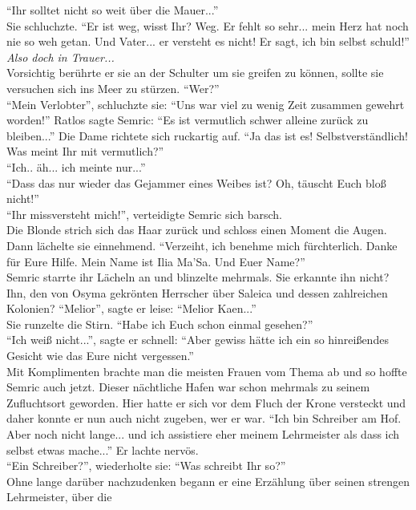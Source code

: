 ``Ihr solltet nicht so weit über die Mauer...''\\
Sie schluchzte. ``Er ist weg, wisst Ihr? Weg. Er fehlt so sehr... mein Herz hat noch nie so weh 
getan. Und Vater... er versteht es nicht! Er sagt, ich bin selbst schuld!''\\
\textit{Also doch in Trauer...}\\ Vorsichtig berührte er sie an der Schulter um sie greifen zu 
können, sollte sie versuchen sich ins Meer zu stürzen. ``Wer?''\\
``Mein Verlobter'', schluchzte sie: ``Uns war viel zu wenig Zeit zusammen gewehrt worden!''
Ratlos sagte Semric: ``Es ist vermutlich schwer alleine zurück zu bleiben...''
Die Dame richtete sich ruckartig auf. ``Ja das ist es! Selbstverständlich! Was meint Ihr mit 
vermutlich?''\\
``Ich.. äh... ich meinte nur...''\\
``Dass das nur wieder das Gejammer eines Weibes ist? Oh, täuscht Euch bloß nicht!''\\
``Ihr missversteht mich!'', verteidigte Semric sich barsch.\\
Die Blonde strich sich das Haar zurück und schloss einen Moment die Augen. Dann lächelte sie 
einnehmend. ``Verzeiht, ich benehme mich fürchterlich. Danke für Eure Hilfe. Mein Name ist Ilia 
Ma'Sa. Und Euer Name?''\\
Semric starrte ihr Lächeln an und blinzelte mehrmals. Sie erkannte ihn nicht? Ihn, den von Osyma 
gekrönten Herrscher über Saleica und dessen zahlreichen Kolonien? ``Melior'', sagte er leise: 
``Melior Kaen...''\\
Sie runzelte die Stirn. ``Habe ich Euch schon einmal gesehen?''\\
``Ich weiß nicht...'', sagte er schnell: ``Aber gewiss hätte ich ein so hinreißendes Gesicht wie 
das Eure nicht vergessen.''\\
Mit Komplimenten brachte man die meisten Frauen vom Thema ab und so hoffte Semric auch jetzt. 
Dieser nächtliche Hafen war schon mehrmals zu seinem Zufluchtsort geworden. Hier hatte er sich vor 
dem Fluch der Krone versteckt und daher konnte er nun auch nicht zugeben, wer er war. 
``Ich bin Schreiber am Hof. Aber noch nicht lange... und ich assistiere eher meinem Lehrmeister als 
dass ich selbst etwas mache...'' Er lachte nervös. \\
``Ein Schreiber?'', wiederholte sie: ``Was schreibt Ihr so?''\\
Ohne lange darüber nachzudenken begann er eine Erzählung über seinen strengen Lehrmeister, über die 
